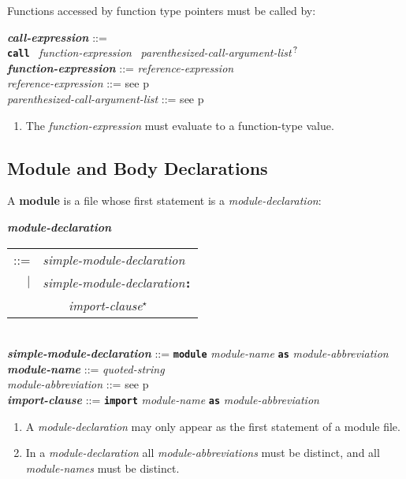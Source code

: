 \documentclass[12pt]{article}
\newcommand{\TT}[1]{{\tt \bfseries #1}}
\newcommand{\STAR}{{\Large $^\star$}}
\newcommand{\QMARK}{{$^{\,\mbox{\footnotesize ?}}$}}
\newcommand{\key}[1]{{\rm \bfseries #1}}
\newcommand{\ttkey}[1]{{\tt \bfseries #1}}
\newcommand{\emkey}[1]{{\em \bfseries #1}}
\newcommand{\pagref}[1]{p\pageref{#1}}
\newenvironment{indpar}[1][0.3in]%
	{\begin{list}{}%
		     {\setlength{\itemsep}{0in}%
		      \setlength{\topsep}{0in}%
		      \setlength{\parsep}{1ex}%
		      \setlength{\labelwidth}{#1}%
		      \setlength{\leftmargin}{#1}%
		      \addtolength{\leftmargin}{\labelsep}}%
	 \item}%
	{\end{list}}
\begin{document}
Functions accessed by function type pointers must be called by:
\begin{indpar}
\emkey{call-expression}\label{CALL-EXPRESSION} ::= \\
\hspace*{0.25in}
	\ttkey{call}~ {\em function-expression}~
	     {\em parenthesized-call-argument-list}\QMARK{}
\\[0.5ex]
\emkey{function-expression} ::= {\em reference-expression}
\\[0.5ex]
{\em reference-expression} ::= see \pagref{REFERENCE-EXPRESSION}
\\[0.5ex]
{\em parenthesized-call-argument-list} ::=
    see \pagref{PARENTHESIZED-CALL-ARGUMENT-LIST}
\begin{enumerate}
\item
The {\em function-expression} must evaluate to
a function-type value.
\end{enumerate}
\end{indpar}



\subsection{Module and Body Declarations}
\label{MODULE-AND-BODY-DECLARATIONS}

A \key{module} is a file whose first statement is a {\em module-declaration}:

\begin{indpar}
\emkey{module-declaration}\label{MODULE-DECLARATION}
    \begin{tabular}[t]{rl}
    ::= & {\em simple-module-declaration} \\
    $|$ & {\em simple-module-declaration}\TT{:} \\
	& \TT{~~~~}{\em import-clause}\STAR{} \\
    \end{tabular} \\
\emkey{simple-module-declaration} ::= \TT{module} {\em module-name}
        \TT{as} {\em module-abbreviation} \\
\emkey{module-name}\label{MODULE-NAME} ::= {\em quoted-string} \\
{\em module-abbreviation} ::= see \pagref{MODULE-ABBREVIATION} \\
\emkey{import-clause}\label{IMPORT-CLAUSE}
    ::= \ttkey{import} {\em module-name} \TT{as} {\em module-abbreviation}

\begin{enumerate}

\item
A {\em module-declaration} may only appear as the first statement
of a module file.

\item
In a {\em module-declaration} all {\em module-abbreviations} must be
distinct, and all {\em module-names} must be distinct.
\end{enumerate}
\end{indpar}
\end{document}
